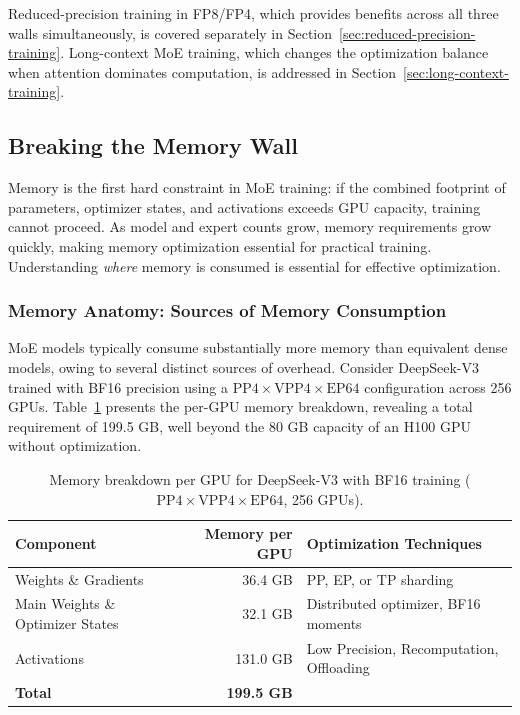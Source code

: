 \documentclass[10pt,logo,copyright]{nvidiatechreport}
\begin{document}
Reduced-precision training in FP8/FP4, which provides benefits across all three walls simultaneously, is covered separately in Section~\ref{sec:reduced-precision-training}. Long-context MoE training, which changes the optimization balance when attention dominates computation, is addressed in Section~\ref{sec:long-context-training}.

\subsection{Breaking the Memory Wall}\label{sec:memory-wall}

Memory is the first hard constraint in MoE training: if the combined footprint of parameters, optimizer states, and activations exceeds GPU capacity, training cannot proceed. As model and expert counts grow, memory requirements grow quickly, making memory optimization essential for practical training. Understanding \emph{where} memory is consumed is essential for effective optimization.

\subsubsection{Memory Anatomy: Sources of Memory Consumption}

MoE models typically consume substantially more memory than equivalent dense models, owing to several distinct sources of overhead. Consider DeepSeek-V3 trained with BF16 precision using a $\text{PP}4 \times \text{VPP}4 \times \text{EP}64$ configuration across 256 GPUs. Table~\ref{tab:memory-breakdown} presents the per-GPU memory breakdown, revealing a total requirement of 199.5 GB, well beyond the 80 GB capacity of an H100 GPU without optimization.

\begin{table}[ht]
\centering
\caption{Memory breakdown per GPU for DeepSeek-V3 with BF16 training ($\text{PP}4 \times \text{VPP}4 \times \text{EP}64$, 256 GPUs).}
\label{tab:memory-breakdown}
\begin{tabular}{lrl}
\toprule
\textbf{Component} & \textbf{Memory per GPU} & \textbf{Optimization Techniques} \\
\midrule
Weights \& Gradients & 36.4 GB & PP, EP, or TP sharding \\
Main Weights \& Optimizer States & 32.1 GB & Distributed optimizer, BF16 moments \\
Activations & 131.0 GB & Low Precision, Recomputation, Offloading \\
\midrule
\textbf{Total} & \textbf{199.5 GB} & \\
\bottomrule
\end{tabular}
\end{table}
\end{document}
